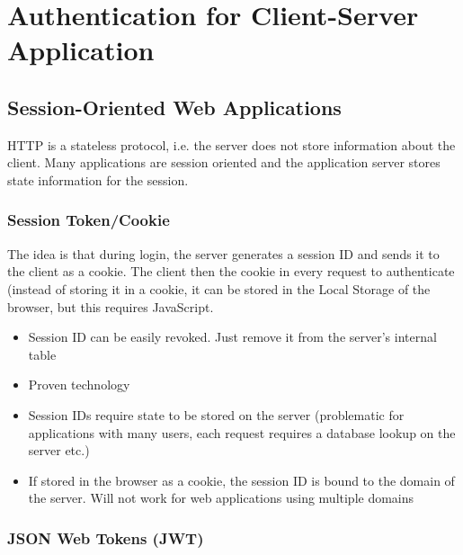 \chapter{Authentication for Client-Server Application}

\section{Session-Oriented Web Applications}

HTTP is a stateless protocol, i.e. the server does not store information about the client. Many applications are session oriented and the application server stores state information for the session.

\subsection{Session Token/Cookie}

The idea is that during login, the server generates a session ID and sends it to
the client as a cookie. The client then the cookie in every request to authenticate (instead of storing it in a cookie, it can be stored in the Local Storage of the browser, but this requires JavaScript.

\begin{minipage}[t]{0.48\textwidth}
    \begin{itemize}
        \item Session ID can be easily revoked. Just remove it from the server’s internal table
        \item Proven technology
    \end{itemize}
\end{minipage}
\hfill
\begin{minipage}[t]{0.48\textwidth}
    \begin{itemize}
        \item Session IDs require state to be stored on the server (problematic for applications with many users, each request requires a database lookup on the server etc.)
        \item If stored in the browser as a cookie, the session ID is bound to the domain of the server. Will not work for web applications using multiple domains
    \end{itemize}
\end{minipage}

\subsection{JSON Web Tokens (JWT)}

